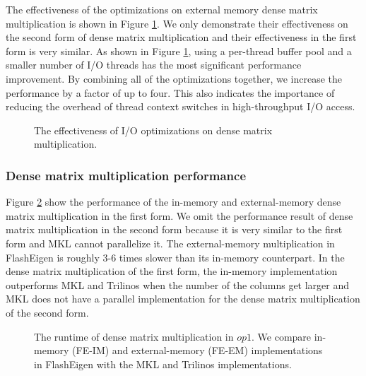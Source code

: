 The effectiveness of the optimizations on external memory dense matrix
multiplication is shown in Figure \ref{perf:dmm_opts}. We only demonstrate
their effectiveness on the second form of dense matrix multiplication and
their effectiveness in the first form is very similar. As shown in Figure
\ref{perf:dmm_opts}, using a per-thread buffer pool and a smaller number
of I/O threads has the most significant performance improvement. By combining
all of the optimizations together, we increase the performance by a factor
of up to four. This also indicates the importance of reducing the overhead
of thread context switches in high-throughput I/O access.

\begin{figure}
	\begin{center}
		\footnotesize
		\vspace{-15pt}
		
		\vspace{-15pt}
		\caption{The effectiveness of I/O optimizations on dense matrix
		multiplication.}
		\label{perf:dmm_opts}
	\end{center}
\end{figure}


\subsubsection{Dense matrix multiplication performance}

Figure \ref{perf:gemm} show the performance of the in-memory and external-memory
dense matrix multiplication in the first form. We omit the performance result
of dense matrix multiplication in the second form because it is very similar
to the first form and MKL cannot parallelize it.
The external-memory multiplication in FlashEigen is roughly 3-6 times slower
than its in-memory counterpart. In the dense matrix multiplication of
the first form, the in-memory implementation outperforms MKL and Trilinos
when the number of the columns get larger and MKL does not have a parallel
implementation for the dense matrix multiplication of the second form.

\begin{figure}
	\begin{center}
		\footnotesize
		\vspace{-15pt}
		
		\vspace{-15pt}
		\caption{The runtime of dense matrix multiplication in $op1$. We compare
			in-memory (FE-IM) and external-memory (FE-EM) implementations
			in FlashEigen with the MKL and Trilinos implementations.}
		\label{perf:gemm}
	\end{center}
\end{figure}

